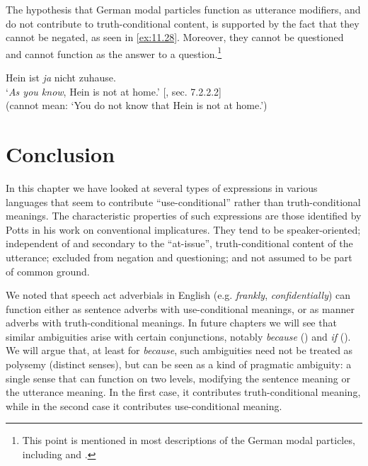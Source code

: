 The hypothesis that German modal particles function as utterance modifiers, and do not contribute to truth-conditional content, is supported by the fact that they cannot be negated, as seen in \ref{ex:11.28}. Moreover, they cannot be questioned and cannot function as the answer to a question.\footnote{This point is mentioned in most descriptions of the German modal particles, including \citet{Bross2012} and \citet{Gutzmann2015}.}


\ea \label{ex:11.28}
Hein ist \textit{ja} nicht zuhause.\\
\glt ‘\textit{As you know}, Hein is not at home.’  [\citealt{Gutzmann2015}, sec. 7.2.2.2]\\
(cannot mean: ‘You do not know that Hein is not at home.’)
\z

\section{Conclusion}\label{sec:11.7}

In this chapter we have looked at several types of expressions in various languages that seem to contribute “use-conditional” rather than truth-conditional meanings. The characteristic properties of such expressions are those identified by Potts in his work on conventional implicatures. They tend to be speaker-oriented; independent of and secondary to the “at-issue”, truth-conditional content of the utterance; excluded from negation and questioning; and not assumed to be part of common ground.



We noted that speech act adverbials in English (e.g. \textit{frankly}, \textit{confidentially}) can function either as sentence adverbs with use-conditional meanings, or as manner adverbs with truth-conditional meanings. In future chapters we will see that similar ambiguities arise with certain conjunctions, notably \textit{because} () and \textit{if} (). We will argue that, at least for \textit{because}, such ambiguities need not be treated as polysemy (distinct senses), but can be seen as a kind of pragmatic ambiguity: a single sense that can function on two levels, modifying the sentence meaning or the utterance meaning. In the first case, it contributes truth-conditional meaning, while in the second case it contributes use-conditional meaning.



\furtherreading



